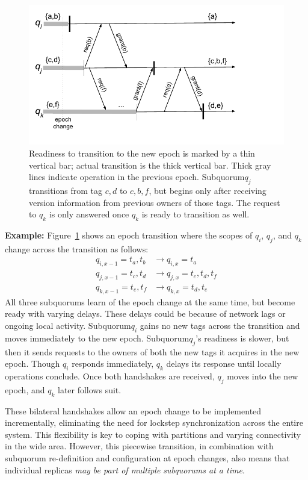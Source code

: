 \documentclass[letterpaper,10pt,twocolumn]{article}
\newcommand{\sub}{subquorum\xspace}
\newcommand{\Sub}{Subquorum\xspace}
\newcommand{\subs}{subquorums\xspace}
\newcommand{\para}[1]{\vspace{.04in}\noindent\textbf{#1}}
\begin{document}
\begin{figure}[t]
\centering
\includegraphics[width=.6\textwidth]{figures/namespaceHandoff}
\vspace{-.2in}
\caption{Readiness to transition to the new epoch is marked by a thin vertical bar; actual
  transition is the thick vertical bar.  Thick gray lines indicate
  operation in the previous epoch.  \Sub $q_j$ transitions from tag ${c,d}$ to
  ${c,b,f}$, but begins only after receiving version
  information from previous owners of those tags.  The request to $q_k$ is only answered
  once $q_k$ is ready to transition as well.}
\vspace{-.2in}
\label{fig:handoff}
\end{figure}
\para{Example:}
Figure~\ref{fig:handoff} shows an epoch transition where the scopes of
$q_i$, $q_j$, and $q_k$ change across the transition as follows:
\begin{align*}
  \label{eq:3}
  q_{i,x-1} = t_a, t_b  &\longrightarrow q_{i,x} = t_a\\
  q_{j,x-1} = t_c, t_d  &\longrightarrow q_{j,x} = t_c,t_d,t_f\\
  q_{k,x-1} = t_e, t_f  &\longrightarrow q_{k,x} = t_d,t_e
\end{align*}
All three \subs learn of the epoch change at the same time, but become ready
with varying delays.
These delays could be because of network lags or ongoing local activity.
\Sub $q_i$ gains no new tags across the transition and moves immediately to the new epoch.
\Sub $q_j$'s readiness is slower, but then it sends requests to the
owners of both the new tags it acquires in the new epoch.
Though $q_i$ responds immediately, $q_k$ delays its response until locally
operations conclude.
Once both handshakes are received, $q_j$ moves into the new epoch, and $q_k$
later follows suit.

These bilateral handshakes allow an epoch change to be implemented
incrementally, eliminating the need for lockstep synchronization across the entire
system.
This flexibility is key to coping with partitions and varying connectivity in
the wide area.
However, this piecewise transition, in combination with \sub re-definition and
configuration at epoch changes, also means that individual replicas \emph{may
be part of multiple \subs at a time}.
\end{document}
